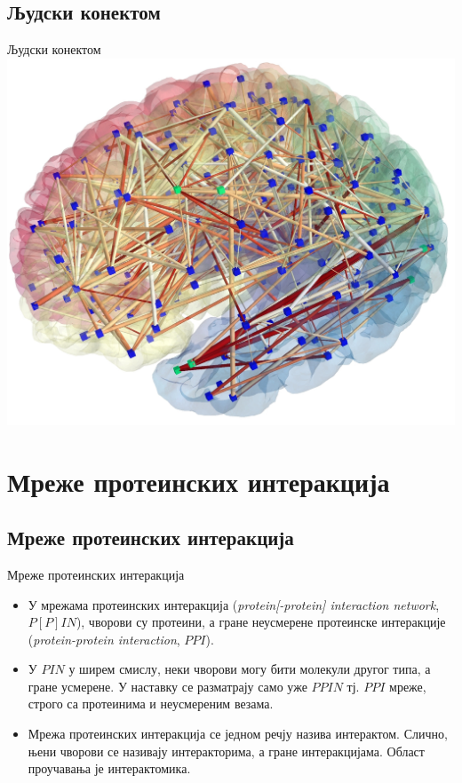 \documentclass[hyperref={bookmarks=false}]{beamer}
\begin{document}
\subsection{Људски конектом}
\begin{frame}{Људски конектом}
\centering\includegraphics[width=.75\textwidth]{konektom.jpg}
\end{frame}

\section{Мреже протеинских интеракција}
\subsection{Мреже протеинских интеракција}
\begin{frame}{Мреже протеинских интеракција}
\begin{itemize}
	\item У мрежама протеинских интеракција (\textit{protein[-protein] interaction network}, $P[P]IN$), чворови су протеини, а гране неусмерене протеинске интеракције (\textit{protein-protein interaction}, $PPI$).

	\item У $PIN$ у ширем смислу, неки чворови могу бити молекули другог типа, а гране усмерене. У наставку се разматрају само уже $PPIN$ тј. $PPI$ мреже, строго са протеинима и неусмереним везама.

	\item Мрежа протеинских интеракција се једном речју назива интерактом. Слично, њени чворови се називају интеракторима, а гране интеракцијама. Област проучавања је интерактомика.
\end{itemize}
\end{frame}
\end{document}
